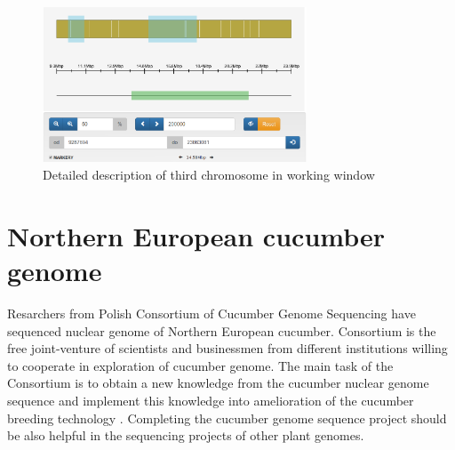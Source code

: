 \documentclass[]{spie}
\begin{document}
\begin{figure}[htp]
  \centering
  \includegraphics[width=0.7\textwidth]{img/skafoldy2.png}
  \caption{Detailed description of third chromosome in working window}
  \label{fig:chromosome}
\end{figure}

\section{Northern European cucumber genome}
Resarchers from Polish Consortium of Cucumber Genome Sequencing have sequenced nuclear genome of Northern European cucumber.
Consortium is the free joint-venture of scientists and businessmen from different institutions willing to cooperate in exploration of cucumber genome. The main task of the Consortium is to obtain a new knowledge from the cucumber nuclear genome sequence and implement this knowledge into amelioration of the cucumber breeding technology \cite{pawelkowicz2016next, przybecki2003isolation, przybecki2004polymorphom}. Completing the cucumber genome sequence project should be also helpful in the sequencing projects of other plant genomes.
\end{document}

